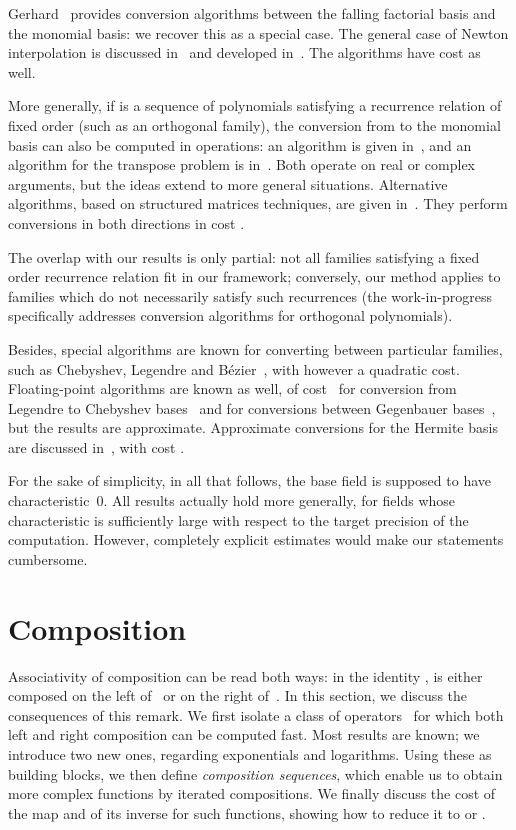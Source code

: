 \documentclass{sig-alternate}
\begin{document}
Gerhard~\cite{Gerhard00} provides  conversion
algori\-thms between the falling factorial basis and the monomial basis:
we recover this as a special case.  The general case of Newton
interpolation is discussed in~\cite[p. 67]{BiPa94} and
developed in~\cite{BoSc05}. The algorithms have cost  as well.

More generally, if  is a sequence of polynomials satisfying a
recurrence relation of fixed order (such as an orthogonal family), the
conversion from  to the monomial basis  can also be
computed in  operations: an algorithm is given
in~\cite{PoStTa98}, and an algorithm for the transpose problem is
in~\cite{DrHeRo97}. Both operate on real or complex arguments, but the
ideas extend to more general situations.  Alternative algorithms,
based on structured matrices techniques, are given
in~\cite{Heinig01}. They perform conversions in both directions in
cost .

The overlap with our results is only partial: not all families
satisfying a fixed order recurrence relation fit in our framework;
conversely, our method applies to families which do not necessarily
satisfy such recurrences (the work-in-progress~\cite{BoSaSc08}
specifically addresses conversion algorithms for orthogonal polynomials).

Besides, special algorithms are known for converting between
particular families, such as Chebyshev, Legendre and
B\'ezier~\cite{LiZh98,BaPe04}, with however a quadratic
cost. Floating-point algorithms are known as well, of cost~ for
conversion from Legendre to Chebyshev bases~\cite{AlRo91} and  for conversions between Gegenbauer bases~\cite{Keiner07},
but the results are approximate. Approximate conversions for the
Hermite basis are discussed in~\cite{LeRoCh07}, with cost .

\smallskip{} For the sake of
simplicity, in all that follows, the base field is supposed to have
characteristic~0. All results actually hold more generally, for fields
whose characteristic is sufficiently large with respect to the target
precision of the computation. However, completely explicit estimates
would make our statements cumbersome.



\section{Composition}\label{sec:compose}
Associativity of composition can be read both ways: in the identity
,  is either composed on the left of~
or on the right of~.  In this section, we discuss the consequences
of this remark.  We first isolate a class of operators~ for which
both left and right composition can be computed fast. Most results are
known; we introduce two new ones, regarding exponentials and logarithms.
Using these as building blocks, we then define \emph{composition
sequences}, which enable us to obtain more complex functions by
iterated compositions. We finally discuss the cost of the map
 and of its inverse for such functions, showing how to
reduce it to  or .
\end{document}
